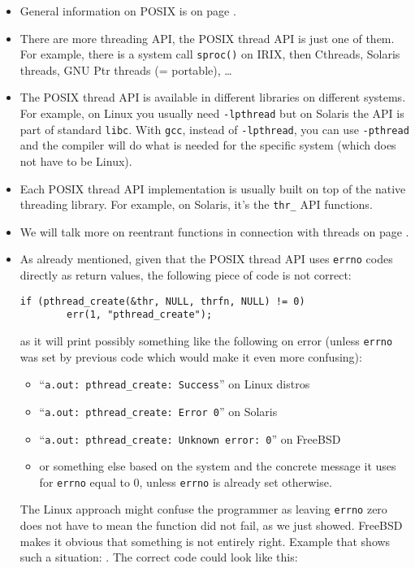 \begin{itemize}
\item General information on POSIX is on page \pageref{POSIX}.
\item There are more threading API, the POSIX thread API is just one of them.
For example, there is a system call \texttt{sproc()} on IRIX, then Cthreads,
Solaris threads, GNU Ptr threads (= portable), \dots
\item The POSIX thread API is available in different libraries on different
systems.  For example, on Linux you usually need \texttt{-lpthread} but on
Solaris the API is part of standard \texttt{libc}.  With \texttt{gcc}, instead
of \texttt{-lpthread}, you can use \texttt{-pthread} and the compiler will do
what is needed for the specific system (which does not have to be Linux).
\item Each POSIX thread API implementation is usually built on top of the native
threading library.  For example, on Solaris, it's the \texttt{thr\_} API
functions.
\item We will talk more on reentrant functions in connection with threads on
page \pageref{THREADSAFE}.
\item As already mentioned, given that the POSIX thread API uses \texttt{errno}
codes directly as return values, the following piece of code is not correct:

\begin{verbatim}
if (pthread_create(&thr, NULL, thrfn, NULL) != 0)
        err(1, "pthread_create");
\end{verbatim}

as it will print possibly something like the following on error (unless
\texttt{errno} was set by previous code which would make it even more
confusing):

\begin{itemize}
\item ``\texttt{a.out: pthread\_create: Success}'' on Linux distros
\item ``\texttt{a.out: pthread\_create: Error 0}'' on Solaris
\item ``\texttt{a.out: pthread\_create: Unknown error: 0}'' on FreeBSD
\item or something else based on the system and the concrete message it uses for
\texttt{errno} equal to 0, unless \texttt{errno} is already set otherwise.
\end{itemize}

The Linux approach might confuse the programmer as leaving \texttt{errno} zero
does not have to mean the function did not fail, as we just showed.  FreeBSD
makes it obvious that something is not entirely right.  Example that shows such
a situation: . The correct code could look
like this:


\end{itemize}
